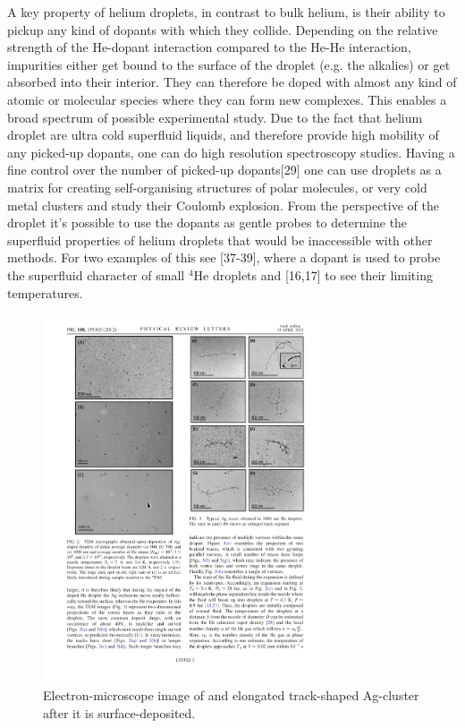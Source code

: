 \documentclass[12pt,a4paper,twosides]{book}
\begin{document}
		A key property of helium droplets, in contrast to bulk helium, is their ability to pickup any kind of dopants with which they collide. Depending on the relative strength of the He-dopant interaction compared to the He-He interaction, impurities either get bound to the surface of the droplet (e.g. the alkalies) or get absorbed into their interior. They can therefore be doped with almost any kind of atomic or molecular species where they can form new complexes. This enables a broad spectrum of possible experimental study. Due to the fact that helium droplet are ultra cold superfluid liquids, and therefore provide high mobility of any picked-up dopants, one can do high resolution spectroscopy studies. Having a fine control over the number of picked-up dopants[29] one can use droplets as a matrix for creating self-organising structures of polar molecules, or very cold metal clusters and study their Coulomb explosion. From the perspective of the droplet it's possible to use the dopants as gentle probes to determine the superfluid properties of helium droplets that would be inaccessible with other methods. For two examples of this see [37-39], where a dopant is used to probe the superfluid character of small $^4$He droplets and [16,17] to see their limiting temperatures.\\
		
		\begin{figure}[t]
			\begin{center}
				\includegraphics[width=0.75\textwidth]{silver-filament}
				\caption{Electron-microscope image of and elongated track-shaped Ag-cluster after it is surface-deposited.}
				\label{fig:silver-filament}
			\end{center}
		\end{figure}	
				
\end{document}
